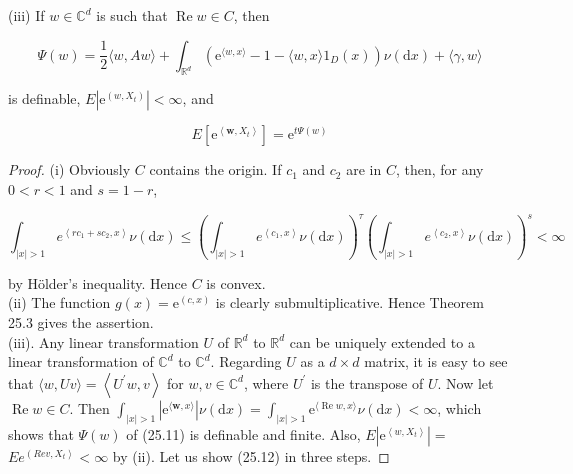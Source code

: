 \documentclass[a4paper,11pt]{article}
\begin{document}
(iii) If $w \in \mathbb{C}^{d}$ is such that $\operatorname{Re} w \in C$, then


\begin{equation*}
    \Psi(w)=\frac{1}{2}\langle w, A w\rangle+\int_{\mathbb{R}^{d}}\left(\mathrm{e}^{\langle w, x\rangle}-1-\langle w, x\rangle 1_{D}(x)\right) \nu(\mathrm{d} x)+\langle\gamma, w\rangle \tag{25.11}
\end{equation*}


is definable, $E\left|\mathrm{e}^{\left(w, X_{t}\right)}\right|<\infty$, and


\begin{equation*}
    E\left[\mathrm{e}^{\left\langle\boldsymbol{w}, X_{t}\right\rangle}\right]=\mathrm{e}^{t \Psi(w)} \tag{25.12}
\end{equation*}

\begin{proof}
    (i) Obviously $C$ contains the origin. If $c_{1}$ and $c_{2}$ are in $C$, then, for any $0<r<1$ and $s=1-r$,

    $$
        \int_{|x|>1} e^{\left\langle r c_{1}+s c_{2}, x\right\rangle} \nu(\mathrm{d} x) \leq\left(\int_{|x|>1} e^{\left\langle c_{1}, x\right\rangle } \nu(\mathrm{d} x)\right)^{\tau}\left(\int_{|x|>1} e^{\left\langle c_{2}, x\right\rangle} \nu(\mathrm{d} x)\right)^{s}<\infty
    $$

    by Hölder's inequality. Hence $C$ is convex.\\

    (ii) The function $g(x)=\mathrm{e}^{(c, x)}$ is clearly submultiplicative. Hence Theorem 25.3 gives the assertion. \\

    (iii). Any linear transformation $U$ of $\mathbb{R}^{d}$ to $\mathbb{R}^{d}$ can be uniquely extended to a linear transformation of $\mathbb{C}^{d}$ to $\mathbb{C}^{d}$. Regarding $U$ as a $d \times d$ matrix, it is easy to see that $\langle w, U v\rangle=\left\langle U^{\prime} w, v\right\rangle$ for $w, v \in \mathbb{C}^{d}$, where $U^{\prime}$ is the transpose of $U$. Now let $\operatorname{Re} w \in C$. Then $\int_{|x|>1}\left|\mathrm{e}^{\langle\boldsymbol{w}, x\rangle}\right| \nu(\mathrm{d} x)=\int_{|x|>1} \mathrm{e}^{\langle\operatorname{Re} w, x\rangle} \nu(\mathrm{d} x)<\infty$, which shows that $\Psi(w)$ of (25.11) is definable and finite. Also, $E\left|\mathrm{e}^{\left\langle w, X_{t}\right\rangle}\right|=$ $E e^{\left(R e v, X_{t}\right\rangle}<\infty$ by (ii). Let us show (25.12) in three steps.


\end{proof}
\end{document}
